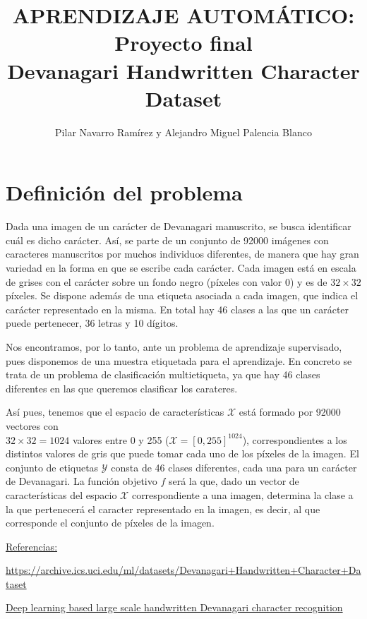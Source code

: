 \documentclass[a4]{article}
\author{Pilar Navarro Ramírez y Alejandro Miguel Palencia Blanco}
\date{\vspace{-5mm}}
\title{\huge APRENDIZAJE AUTOMÁTICO: Proyecto final\\Devanagari Handwritten Character Dataset \HRule\vspace{-4mm}}
\begin{document}
\maketitle
\tableofcontents

\newpage

\section{Definición del problema}

Dada una imagen de un carácter de Devanagari manuscrito, se busca  identificar cuál es dicho carácter. Así, se parte de un conjunto de 92000 imágenes con caracteres manuscritos por muchos individuos diferentes, de manera que hay gran variedad en la forma en que se escribe cada carácter. Cada imagen está en escala de grises con el carácter sobre un fondo negro (píxeles con valor 0) y es de $32\times32$ píxeles. Se dispone además de una etiqueta asociada a cada imagen, que indica el carácter representado en la misma. En total hay 46 clases a las que un carácter puede pertenecer, 36 letras y 10 dígitos. 

Nos encontramos, por lo tanto, ante un problema de aprendizaje supervisado, pues disponemos de una muestra etiquetada para el aprendizaje. En concreto se trata de un problema de clasificación multietiqueta, ya que hay 46 clases diferentes en las que queremos clasificar los carateres. 

Así pues, tenemos que el espacio de características $\mathcal{X}$ está formado por 92000 vectores con\\ $32\times32=1024$ valores entre 0 y 255 ($\mathcal{X}=[0,255]^{1024}$), correspondientes a los distintos valores de gris que puede tomar cada uno de los píxeles de la imagen. El conjunto de etiquetas $\mathcal{Y}$ consta de 46 clases diferentes, cada una para un carácter de Devanagari. La función objetivo $ f $ será la que, dado un vector de características del espacio $\mathcal{X}$ correspondiente a una imagen, determina la clase a la que pertenecerá el caracter representado en la imagen, es decir, al que corresponde el conjunto de píxeles de la imagen. 

\underline{Referencias:}

\href{https://archive.ics.uci.edu/ml/datasets/Devanagari+Handwritten+Character+Dataset}{https://archive.ics.uci.edu/ml/datasets/Devanagari+Handwritten+Character+Dataset}

\href{https://ieeexplore.ieee.org/stamp/stamp.jsp?tp=&arnumber=7400041}{Deep learning based large scale handwritten Devanagari character recognition}
\end{document}
